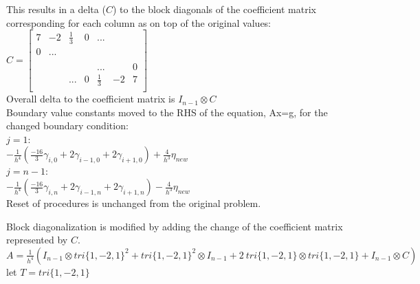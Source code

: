 \documentclass[12pt,letter]{article}
\begin{document}
\begin{enumerate}
\begin{enumerate}
    This results in a delta ($C$) to the block diagonals of the coefficient matrix corresponding for each column as on top of the original values:\\
    
    $C = 
    \begin{bmatrix}
      7 & -2 & \frac{1}{3} & 0 & ... & &\\
      0 & ... & & & & &\\
      & & & & & &\\
      & & & & ... & & 0 \\
      & & ... & 0 &\frac{1}{3} & -2 & 7\\
    \end{bmatrix}
    $\\

    Overall delta to the coefficient matrix is $I_{n-1} \otimes C$\\

    Boundary value constants moved to the RHS of the equation, Ax=g, for the changed boundary condition:\\
    
    $j=1$:\\
    $-\frac{1}{h^4}(\frac{-16}{3}\gamma_{i,0}+2\gamma_{i-1,0}+2\gamma_{i+1,0})+\frac{4}{h^3} \eta_{new}$\\

    $j=n-1$:\\
    $-\frac{1}{h^4}(\frac{-16}{3}\gamma_{i,n}+2\gamma_{i-1,n}+2\gamma_{i+1,n})-\frac{4}{h^3} \eta_{new}$\\

    Reset of procedures is unchanged from the original problem.\\
    
    \pagebreak
    
    Block diagonalization is modified by adding the change of the coefficient matrix represented by $C$.\\
  
  $A=\frac{1}{h^4}(I_{n-1} \otimes tri\{1,-2,1\}^2 + tri\{1,-2,1\}^2 \otimes I_{n-1}+
  2\ tri\{1,-2,1\} \otimes tri\{1,-2,1\}+I_{n-1} \otimes C)$\\

  let $T=tri\{1,-2,1\}$\\
  

\end{enumerate}
\end{enumerate}
\end{document}
